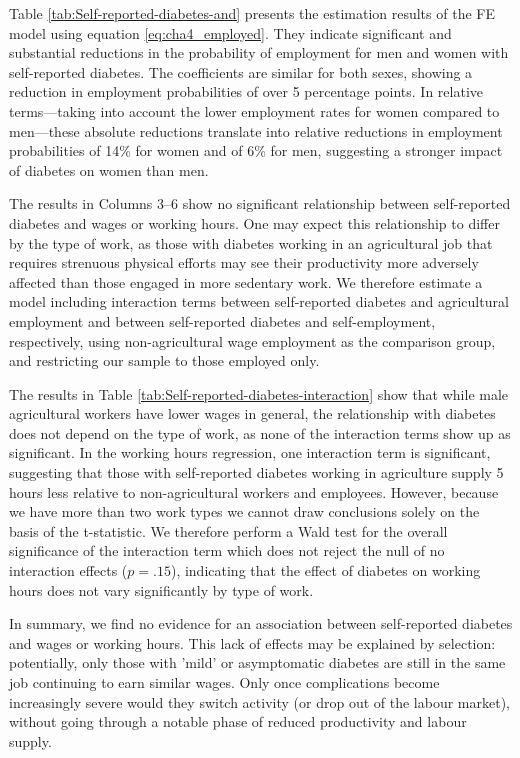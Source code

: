 Table \ref{tab:Self-reported-diabetes-and} presents the estimation results of the \ac{FE} model using equation \ref{eq:cha4_employed}. They indicate significant and substantial reductions in the probability of employment for men and women with self-reported diabetes. The coefficients are similar for both sexes, showing a reduction in employment probabilities of over 5 percentage points. In relative terms---taking into account the lower employment rates for women compared to men---these absolute reductions translate into relative reductions in employment probabilities of 14\% for women and of 6\% for men, suggesting a stronger impact of diabetes on women than men.

The results in Columns 3--6 show no significant relationship between self-reported diabetes and wages or working hours. One may expect this relationship to differ by the type of work, as those  with diabetes working in an agricultural job that requires strenuous physical efforts may see their productivity more adversely affected than those engaged in more sedentary work. We therefore estimate a model including interaction terms between self-reported diabetes and agricultural employment and between self-reported diabetes and self-employment, respectively, using non-agricultural wage employment as the comparison group, and restricting our sample to those employed only. 

The results in Table \ref{tab:Self-reported-diabetes-interaction} show that while male agricultural workers have lower wages in general, the relationship with diabetes does not depend on the type of work, as none of the interaction terms show up as significant. In the working hours regression, one interaction term is significant, suggesting that those with self-reported diabetes working in agriculture supply 5 hours less relative to non-agricultural workers and employees. However, because we have more than two work types we cannot draw conclusions
solely on the basis of the t-statistic. We therefore perform a Wald test for the overall significance of the interaction term which does
not reject the null of no interaction effects ($p = .15$), indicating that the effect of diabetes on working hours does not vary significantly by type of work. 

In summary, we find no evidence for an association between self-reported diabetes and wages or working hours. This lack of effects may be explained by selection: potentially, only those with 'mild' or asymptomatic diabetes are still in the same job continuing to earn similar wages. Only once complications become increasingly severe would they switch activity (or drop out of the labour market), without going through a notable phase of reduced productivity and labour supply.

